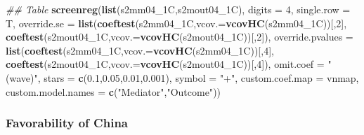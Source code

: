 \documentclass[
]{article}
\newenvironment{Shaded}{\begin{snugshade}}{\end{snugshade}}
\newcommand{\CommentTok}[1]{\textcolor[rgb]{0.56,0.35,0.01}{\textit{#1}}}
\newcommand{\DataTypeTok}[1]{\textcolor[rgb]{0.13,0.29,0.53}{#1}}
\newcommand{\DecValTok}[1]{\textcolor[rgb]{0.00,0.00,0.81}{#1}}
\newcommand{\FloatTok}[1]{\textcolor[rgb]{0.00,0.00,0.81}{#1}}
\newcommand{\KeywordTok}[1]{\textcolor[rgb]{0.13,0.29,0.53}{\textbf{#1}}}
\newcommand{\NormalTok}[1]{#1}
\newcommand{\StringTok}[1]{\textcolor[rgb]{0.31,0.60,0.02}{#1}}
\begin{document}
\begin{Shaded}
\begin{Highlighting}[]
\CommentTok{## Table}
\KeywordTok{screenreg}\NormalTok{(}\KeywordTok{list}\NormalTok{(s2mm04_1C,s2mout04_1C), }\DataTypeTok{digits =} \DecValTok{4}\NormalTok{, }\DataTypeTok{single.row =}\NormalTok{ T,}
          \DataTypeTok{override.se =} \KeywordTok{list}\NormalTok{(}\KeywordTok{coeftest}\NormalTok{(s2mm04_1C,}\DataTypeTok{vcov.=}\KeywordTok{vcovHC}\NormalTok{(s2mm04_1C))[,}\DecValTok{2}\NormalTok{],}
                             \KeywordTok{coeftest}\NormalTok{(s2mout04_1C,}\DataTypeTok{vcov.=}\KeywordTok{vcovHC}\NormalTok{(s2mout04_1C))[,}\DecValTok{2}\NormalTok{]),}
          \DataTypeTok{override.pvalues =} \KeywordTok{list}\NormalTok{(}\KeywordTok{coeftest}\NormalTok{(s2mm04_1C,}\DataTypeTok{vcov.=}\KeywordTok{vcovHC}\NormalTok{(s2mm04_1C))[,}\DecValTok{4}\NormalTok{],}
                                  \KeywordTok{coeftest}\NormalTok{(s2mout04_1C,}\DataTypeTok{vcov.=}\KeywordTok{vcovHC}\NormalTok{(s2mout04_1C))[,}\DecValTok{4}\NormalTok{]),}
          \DataTypeTok{omit.coef =} \StringTok{"(wave)"}\NormalTok{, }\DataTypeTok{stars =} \KeywordTok{c}\NormalTok{(}\FloatTok{0.1}\NormalTok{,}\FloatTok{0.05}\NormalTok{,}\FloatTok{0.01}\NormalTok{,}\FloatTok{0.001}\NormalTok{), }\DataTypeTok{symbol =} \StringTok{"+"}\NormalTok{,}
          \DataTypeTok{custom.coef.map =}\NormalTok{ vnmap, }
          \DataTypeTok{custom.model.names =} \KeywordTok{c}\NormalTok{(}\StringTok{"Mediator"}\NormalTok{,}\StringTok{"Outcome"}\NormalTok{))}
\end{Highlighting}
\end{Shaded}

\hypertarget{favorability-of-china}{%
\subsubsection{Favorability of China}\label{favorability-of-china}}
\end{document}
